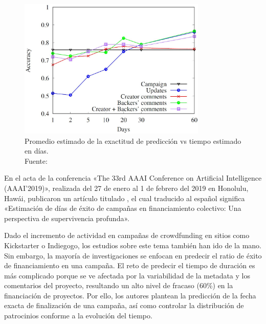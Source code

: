 \begin{figure}[!ht]
	\begin{center}
		\includegraphics[width=0.80\textwidth]{2/figures/lee2018.jpg}
		\caption[Promedio estimado de la exactitud de predicción vs tiempo estimado en días]{Promedio estimado de la exactitud de predicción vs tiempo estimado en días.\\
			Fuente: \cite{pr_lee2018contentDL}}
		\label{2:fig123}
	\end{center}
\end{figure}

En el acta de la conferencia «The 33rd AAAI Conference on Artificial Intelligence (AAAI'2019)», realizada del 27 de enero al 1 de febrero del 2019 en Honolulu, Hawái, \cite{pr_jin2019dayssuccess} publicaron un artículo titulado , el cual traducido al español significa «Estimación de días de éxito de campañas en financiamiento colectivo: Una perspectiva de supervivencia profunda».

Dado el incremento de actividad en campañas de crowdfunding en sitios como Kickstarter o Indiegogo, los estudios sobre este tema también han ido de la mano. Sin embargo, la mayoría de investigaciones se enfocan en predecir el ratio de éxito de financiamiento en una campaña. El reto de predecir el tiempo de duración es más complicado porque se ve afectada por la variabilidad de la metadata y los comentarios del proyecto, resultando un alto nivel de fracaso (60\%) en la financiación de proyectos. Por ello, los autores plantean la predicción de la fecha exacta de finalización de una campaña, así como controlar la distribución de patrocinios conforme a la evolución del tiempo.

